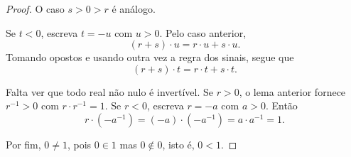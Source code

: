 \begin{proof}
    O caso $s>0>r$ é análogo.

    Se $t<0$, escreva $t=-u$ com $u>0$.
    Pelo caso anterior,
    \[
        (r+s)\cdot u=r\cdot u+s\cdot u.
    \]
    Tomando opostos e usando outra vez a regra dos sinais, segue que
    \[
        (r+s)\cdot t=r\cdot t+s\cdot t.
    \]

    Falta ver que todo real não nulo é invertível.
    Se $r>0$, o lema anterior fornece $r^{-1}>0$ com $r\cdot r^{-1}=1$.
    Se $r<0$, escreva $r=-a$ com $a>0$.
    Então
    \[
        r\cdot(-a^{-1})=(-a)\cdot(-a^{-1})=a\cdot a^{-1}=1.
    \]

    Por fim, $0\neq 1$, pois $0\in 1$ mas $0\notin 0$, isto é, $0<1$.
\end{proof}


